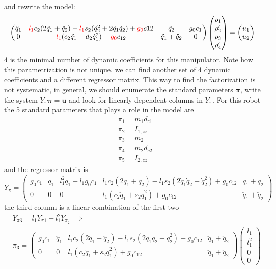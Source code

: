 \documentclass[10pt, a4paper]{report}
\begin{document}
and rewrite the model:\begin{equation}
     \begin{pmatrix}
        \ddot q_1&\color{red}l_1\color{black}c_2(2\ddot q_1+\ddot q_2)-\color{red}l_1\color{black}s_2(\dot q_2^2+2\dot q_1\dot q_2)+\color{red}g_0\color{black}c{12}&\ddot q_2&g_0c_1\\
        0&\color{red}l_1\color{black}(c_2\ddot q_1+d_2\dot q_1^2)+\color{red}g_0\color{black}c_{12} & \ddot q_1+\ddot q_2&0
    \end{pmatrix}\begin{pmatrix}
        \rho_1\\\rho_2'\\\rho_3\\\rho_4'\\
    \end{pmatrix}=\begin{pmatrix}
        u_1\\u_2
    \end{pmatrix}
\end{equation}
4 is the minimal number of dynamic coefficients for this manipulator. Note how this parametrization is not unique, we can find another set of 4 dynamic coefficients and a different regressor matrix. This way to find the factorization is not systematic, in general, we should enumerate the standard parameters $\boldsymbol{\pi}$, write the system $Y_{\pi}\boldsymbol{\pi}=\mathbf u$ and look for linearly dependent columns in $Y_{\pi}$. For this robot the 5 standard parameters that plays a role in the model are\begin{align}
    &\pi_1=m_1d_{c1}\\ 
    &\pi_2=I_{1,zz}\\ 
    &\pi_3=m_2\\ 
    &\pi_4=m_2{d_{c2}}\\
    &\pi_5=I_{2,zz}
\end{align}
and the regressor matrix is\begin{equation}
   Y_{\pi} = \begin{pmatrix} 
g_0 c_1 & \ddot{q}_1 & l_1^2 \ddot{q}_1 + l_1 g_0 c_1 & l_1 c_2 (2\ddot{q}_1 + \ddot{q}_2) - l_1 s_2 (2\dot{q}_1 \dot{q}_2 + \dot{q}_2^2) + g_0 c_{12} & \ddot{q}_1 + \ddot{q}_2 \\
0 & 0 & 0 & l_1 (c_2 \ddot{q}_1 + s_2 \dot{q}_1^2) + g_0 c_{12} & \ddot{q}_1 + \ddot{q}_2 
\end{pmatrix}
\end{equation}
the third column is a linear combination of the first two\begin{align}
    &Y_{\pi 3}=l_1Y_{\pi 1}+l_1^2Y_{\pi _2}\implies \\
    &\pi_3=\begin{pmatrix} 
g_0 c_1 & \ddot{q}_1 & l_1 c_2 (2\ddot{q}_1 + \ddot{q}_2) - l_1 s_2 (2\dot{q}_1 \dot{q}_2 + \dot{q}_2^2) + g_0 c_{12} & \ddot{q}_1 + \ddot{q}_2 \\
0 & 0  & l_1 (c_2 \ddot{q}_1 + s_2 \dot{q}_1^2) + g_0 c_{12} & \ddot{q}_1 + \ddot{q}_2 
\end{pmatrix}\begin{pmatrix}
    l_1\\l_1^2\\0\\0
\end{pmatrix}
\end{align}
\end{document}
